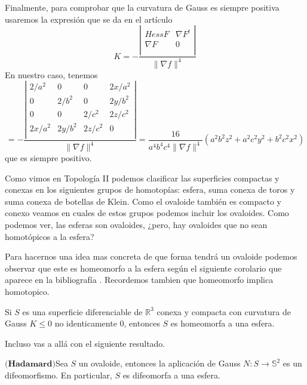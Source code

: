 \begin{ejemplo}
	
	Finalmente, para comprobar que la curvatura de Gauss es siempre positiva usaremos la expresión que se da en el artículo \cite{RonGoldman}
	$$
		K = - \frac{ \left| {\begin{array}{cc}
				Hess F & \nabla F^t \\ 
				\nabla F & 0 \\
				\end{array} } \right| }{\| \nabla f \|^4}		 
	$$
	En nuestro caso, tenemos
	\[
		= - \frac{ \left| {\begin{array}{cccc}
				2/a^2 & 0 & 0 & 2x/a^2 \\ 
				0 & 2/b^2 & 0 & 2y/b^2 \\ 
				0 & 0 & 2/c^2 & 2z/c^2 \\ 
				2x/a^2 & 2y/b^2 & 2z/c^2 & 0 \\
				\end{array} } \right| }{\| \nabla f \|^4}
		= \frac{16}{a^4b^4c^4 \| \nabla f \|^4}(a^2 b^2 z^2+a^2c^2y^2+b^2c^2x^2)
	\]
	que es siempre positivo.
\end{ejemplo}
Como vimos en Topología II podemos clasificar las superficies compactas y conexas en los siguientes grupos de homotopías: esfera, suma conexa de toros y suma conexa de botellas de Klein. Como el ovaloide también es compacto y conexo veamos en cuales de estos grupos podemos incluir los ovaloides. Como podemos ver, las esferas son ovaloides, ¿pero, hay ovaloides que no sean homotópicos a la esfera?

Para hacernos una idea mas concreta de que forma tendrá un ovaloide podemos observar que este es homeomorfo a la esfera según el siguiente corolario que aparece en la bibliografía \cite{ref1}. Recordemos tambien que homeomorfo implica homotopico.

\begin{corolario}
	Si $S$ es una superficie diferenciable de $\mathbb{R}^3$ conexa y compacta con curvatura de Gauss $K \leq 0$ no identicamente $0$, entonces $S$ es homeomorfa a una esfera.
\end{corolario}

Incluso vas a allá con el siguiente resultado.

\begin{teorema}
	$\textbf{(Hadamard)}$Sea $S$ un ovaloide, entonces la aplicación de Gauss $N : S \to \mathbb{S}^2$ es un difeomorfismo. En particular, $S$ es difeomorfa a una esfera.
\end{teorema}



